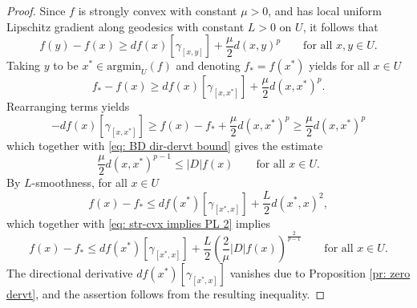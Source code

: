 \documentclass{article}
\theoremstyle{plain}\newtheorem{theorem}{Theorem}[section]
\theoremstyle{plain}\newtheorem{definition}[theorem]{Definition}
\theoremstyle{plain}\newtheorem{lemma}[theorem]{Lemma}
\theoremstyle{definition}\newtheorem{remark}[theorem]{Remark}
\theoremstyle{definition}\newtheorem{example}[theorem]{Example}
\theoremstyle{plain}\newtheorem{proposition}[theorem]{Proposition}
\theoremstyle{plain}\newtheorem{inference}[theorem]{Inference}
\theoremstyle{plain}\newtheorem{corollary}[theorem]{Corollary}
\theoremstyle{plain}\newtheorem{assumption}[theorem]{Assumption}
\begin{document}
\begin{proof}
    Since $f$ is strongly convex with constant $\mu>0$, and has local uniform Lipschitz gradient along geodesics with constant $L>0$ on $U$, it follows that
    $$
    f(y)-f(x)\geq df(x)[\gamma_{[x,y]}]+\frac{\mu}{2}d(x,y)^p \qquad\text{for all}\,\,x,y\in U.
    $$
    Taking $y$ to be $x^*\in\mathrm{argmin}_U(f)$ and denoting $f_* = f(x^*)$ yields for all $x\in U$
    $$
    f_*-f(x)\geq df(x)[\gamma_{[x,x^*]}]+\frac{\mu}{2}d(x,x^*)^p.
    $$
    Rearranging terms yields
    $$
    -df(x)[\gamma_{[x, x^*]}]\geq f(x)-f_*+\frac{\mu}{2}d(x,x^*)^p\geq\frac{\mu}{2}d(x,x^*)^p
    $$
    which together with \eqref{eq: BD dir-dervt bound} gives the estimate
    \begin{equation}\label{eq: str-cvx implies PL 2}
        \frac{\mu}{2}d(x,x^*)^{p-1}\leq|D|f(x) \qquad\text{for all}\,\,x\in U.
    \end{equation}
    By $L$-smoothness, for all $x\in U$
    $$
    f(x)-f_*\leq df(x^*)[\gamma_{[x^*,x]}]+\frac{L}{2}d(x^*,x)^2,
    $$
    which together with \eqref{eq: str-cvx implies PL 2} implies
    $$
    f(x)-f_*\leq df(x^*)[\gamma_{[x^*,x]}]+\frac{L}{2}\left(\frac{2}{\mu}|D|f(x)\right)^{\frac{2}{p-1}} \qquad\text{for all}\,\,x\in U.
    $$
    The directional derivative $df(x^*)[\gamma_{[x^*,x]}]$ vanishes due to Proposition \ref{pr: zero dervt}, and the assertion follows from the resulting inequality.
\end{proof}
\end{document}

